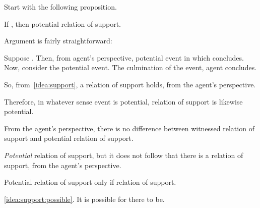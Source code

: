 \begin{note}
  Start with the following proposition.
  \begin{proposition}
    If \fc{}, then potential relation of support.
  \end{proposition}

  Argument is fairly straightforward:
  \begin{argument}
    Suppose \fc{}.
    Then, from agent's perspective, potential event in which concludes.
    Now, consider the potential event.
    The culmination of the event, agent concludes.

    So, from~\autoref{idea:support}, a relation of support holds, from the agent's perspective.

    Therefore, in whatever sense event is potential, relation of support is likewise potential.
  \end{argument}
  From the agent's perspective, there is no difference between witnessed relation of support and potential relation of support.
\end{note}

\begin{note}
  \emph{Potential} relation of support, but it does not follow that there is a relation of support, from the agent's perspective.
\end{note}

\begin{note}
  \begin{proposition}
    Potential relation of support only if relation of support.
  \end{proposition}

  \begin{argument}
    \autoref{idea:support:possible}.
    It is possible for there to be.

    
  \end{argument}
\end{note}

